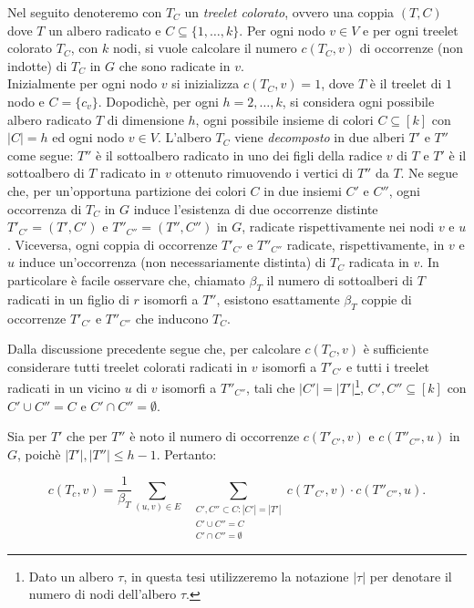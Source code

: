 Nel seguito denoteremo con $ T_C $ un \emph{treelet colorato}, ovvero una coppia $ (T,C) $ dove $ T $ un albero radicato e $ C \subseteq \{1,\dots,k\}$.
Per ogni nodo $ v \in V $ e per ogni treelet colorato $ T_C $, con $ k $ nodi, si vuole calcolare il numero $ c(T_C , v) $ di occorrenze (non indotte) di $ T_C $  in $ G $ che sono radicate in $v$.\\
Inizialmente per ogni nodo $ v $ si inizializza $ c(T_C , v) = 1 $, dove $T$ \`e il treelet di $1$ nodo e $ C = \{c_v\}$.
Dopodichè, per ogni $ h = 2,\dots,k $,  si considera ogni possibile albero radicato $T$ di dimensione $ h $, ogni possibile insieme di colori $ C \subseteq [k] $ con $ |C| = h $ ed ogni nodo $v \in V$.
L'albero $T_C$ viene \emph{decomposto} in due alberi $T'$ e $T''$ come segue: $ T'' $ \`e il sottoalbero radicato in uno dei figli della radice $ v $ di $ T $ e $ T' $ \`e il sottoalbero di $ T $ radicato in $ v $ ottenuto rimuovendo i vertici di $T''$ da $T$.
Ne segue che, per un'opportuna partizione dei colori $C$ in due insiemi $C'$ e $C''$, ogni occorrenza di $T_C$ in $G$ induce l'esistenza di due occorrenze distinte $T'_{C'} = (T', C')$ e $T''_{C''} = (T'', C'')$  in $G$, radicate rispettivamente nei nodi $v$ e $u$.
Viceversa, ogni coppia di occorrenze $T'_{C'}$ e $T''_{C''}$ radicate, rispettivamente, in $v$ e $u$ induce un'occorrenza (non necessariamente distinta) di $T_C$ radicata in $v$.
In particolare è facile osservare che, chiamato $\beta_T$ il numero di sottoalberi di $T$ radicati in un figlio di $r$ isomorfi a $T''$, esistono esattamente $\beta_T$ coppie di occorrenze $T'_{C'}$ e $T''_{C''}$ che inducono $T_C$. 

Dalla discussione precedente segue che, per calcolare $ c(T_C,v)$ è sufficiente considerare tutti treelet colorati radicati in $ v $ isomorfi a $ T'_{C'} $ e tutti i  treelet radicati in un vicino $ u $ di $v$ isomorfi a $ T''_{C''} $, tali che $|C'|=|T'|$\footnote{Dato un albero $\tau$, in questa tesi utilizzeremo la notazione $|\tau|$ per denotare il numero di nodi dell'albero $\tau$.}, $C',C'' \subseteq [k] $ con  $C' \cup C'' = C$ e $C' \cap C'' = \emptyset$.

Sia per $ T' $ che per $ T'' $ \`e noto il numero di occorrenze $ c(T'_{C'},v) $ e $ c(T''_{C''},u) $ in $ G $, poich\`e $|T'|, |T''| \le h-1$. Pertanto:

\begin{equation}\label{conta}
	c(T_c,v)=\frac{1}{\beta_T}\sum_{(u,v)\in E} \;\; \sum_{\substack{C', C'' \subset C : |C'| = |T'| \\C' \cup C'' = C  \\ C' \cap C'' = \emptyset}}c(T'_{C'},v)\cdot c(T''_{C''},u).
\end{equation}

